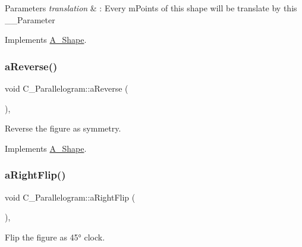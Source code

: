 \begin{DoxyParams}{Parameters}
{\em translation} & \+: Every m\+Points of this shape will be translate by this \+\_\+\+\_\+\+Parameter \\
\hline
\end{DoxyParams}


Implements \hyperlink{classA__Shape_ab284298db1b557ccfa7ba6de7a5fee2c}{A\+\_\+\+Shape}.

\mbox{\label{classC__Parallelogram_a573447294989d53fadf3d7adfb0640c6}} 
\subsubsection{\texorpdfstring{a\+Reverse()}{aReverse()}}
{\footnotesize\ttfamily void C\+\_\+\+Parallelogram\+::a\+Reverse (\begin{DoxyParamCaption}{ }\end{DoxyParamCaption})\hspace{0.3cm}{\ttfamily [override]}, {\ttfamily [virtual]}}



Reverse the figure as symmetry. 



Implements \hyperlink{classA__Shape_afe2c7969d647f6358da13879a7534ecb}{A\+\_\+\+Shape}.

\mbox{\label{classC__Parallelogram_ab638d55c999ea10da7b5000fd034fbc1}} 
\subsubsection{\texorpdfstring{a\+Right\+Flip()}{aRightFlip()}}
{\footnotesize\ttfamily void C\+\_\+\+Parallelogram\+::a\+Right\+Flip (\begin{DoxyParamCaption}{ }\end{DoxyParamCaption})\hspace{0.3cm}{\ttfamily [override]}, {\ttfamily [virtual]}}



Flip the figure as 45° clock. 



